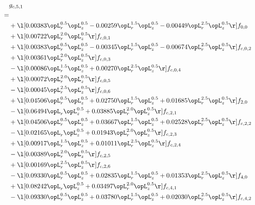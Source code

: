 \begin{alignat}{2} 
\label{eq:g_51_0} 
& g_{c,5,1} \nonumber \\ 
 = \\ 
& + \l[  0.00383 \opL_r^{0.5} \opL_z^{0.5}   -0.00259 \opL_r^{1.5} \opL_z^{0.5}   -0.00449 \opL_r^{2.5} \opL_z^{0.5}  \r] f_{0,0} \nonumber \\ 
& + \l[  0.00722 \opL_r^{2.0} \opL_z^{0.5}  \r] f_{c,0,1} \nonumber \\ 
& + \l[  0.00383 \opL_r^{0.5} \opL_z^{0.5}   -0.00345 \opL_r^{1.5} \opL_z^{0.5}   -0.00674 \opL_r^{2.5} \opL_z^{0.5}  \r] f_{c,0,2} \nonumber \\ 
& + \l[  0.00361 \opL_r^{2.0} \opL_z^{0.5}  \r] f_{c,0,3} \nonumber \\ 
& - \l[  0.00086 \opL_r^{1.5} \opL_z^{0.5} +  0.00270 \opL_r^{2.5} \opL_z^{0.5}  \r] f_{c,0,4} \nonumber \\ 
& + \l[  0.00072 \opL_r^{2.0} \opL_z^{0.5}  \r] f_{c,0,5} \nonumber \\ 
& - \l[  0.00045 \opL_r^{2.5} \opL_z^{0.5}  \r] f_{c,0,6} \nonumber \\ 
& + \l[  0.04506 \opL_r^{0.5} \opL_z^{0.5} +  0.02750 \opL_r^{1.5} \opL_z^{0.5} +  0.01685 \opL_r^{2.5} \opL_z^{0.5}  \r] f_{2,0} \nonumber \\ 
& - \l[  0.06494 \opL_r \opL_z^{0.5} +  0.03885 \opL_r^{2.0} \opL_z^{0.5}  \r] f_{c,2,1} \nonumber \\ 
& + \l[  0.04506 \opL_r^{0.5} \opL_z^{0.5} +  0.03667 \opL_r^{1.5} \opL_z^{0.5} +  0.02528 \opL_r^{2.5} \opL_z^{0.5}  \r] f_{c,2,2} \nonumber \\ 
& - \l[  0.02165 \opL_r \opL_z^{0.5} +  0.01943 \opL_r^{2.0} \opL_z^{0.5}  \r] f_{c,2,3} \nonumber \\ 
& + \l[  0.00917 \opL_r^{1.5} \opL_z^{0.5} +  0.01011 \opL_r^{2.5} \opL_z^{0.5}  \r] f_{c,2,4} \nonumber \\ 
& - \l[  0.00389 \opL_r^{2.0} \opL_z^{0.5}  \r] f_{c,2,5} \nonumber \\ 
& + \l[  0.00169 \opL_r^{2.5} \opL_z^{0.5}  \r] f_{c,2,6} \nonumber \\ 
& - \l[  0.09330 \opL_r^{0.5} \opL_z^{0.5} +  0.02835 \opL_r^{1.5} \opL_z^{0.5} +  0.01353 \opL_r^{2.5} \opL_z^{0.5}  \r] f_{4,0} \nonumber \\ 
& + \l[  0.08242 \opL_r \opL_z^{0.5} +  0.03497 \opL_r^{2.0} \opL_z^{0.5}  \r] f_{c,4,1} \nonumber \\ 
& - \l[  0.09330 \opL_r^{0.5} \opL_z^{0.5} +  0.03780 \opL_r^{1.5} \opL_z^{0.5} +  0.02030 \opL_r^{2.5} \opL_z^{0.5}  \r] f_{c,4,2} \nonumber \\ 

\end{alignat}

